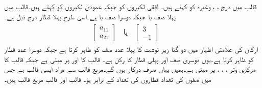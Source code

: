 قالب میں درج ، ،  وغیرہ کو  کہتے ہیں۔ افقی لکیروں کو  جبکہ عمودی لکیروں کو  کہتے ہیں۔قالب  میں پہلا صف  یا  جبکہ دوسرا صف  یا  ہے۔اسی طرح پہلا قطار درج ذیل ہے۔
\begin{gather*}
\begin{aligned}
\begin{bmatrix}
a_{11}\\
a_{21}
\end{bmatrix}\quad \text{یا}\quad 
\begin{bmatrix}
3\\
-1
\end{bmatrix}\quad \text{}\quad 
\end{aligned}
\end{gather*}
ارکان کی علامتی اظہار میں دو گنا زیر نوشت کا پہلا عدد صف کو ظاہر کرتا ہے جبکہ دوسرا عدد قطار کو ظاہر کرتا ہے۔یوں  دوسری صف اور پہلی قطار کا رکن ہے۔ قالب  کا   اور  پر مبنی ہے جبکہ قالب  کا مرکزی وتر ، ، ،  پر مبنی ہے۔ہمیں یہاں صرف  درکار ہوں گے۔مربع قالب سے مراد ایسی قالب ہے جس میں صفوں کی تعداد قطاروں کی تعداد کے برابر ہو۔ قالب  اور قالب  مربع قالب ہیں۔


